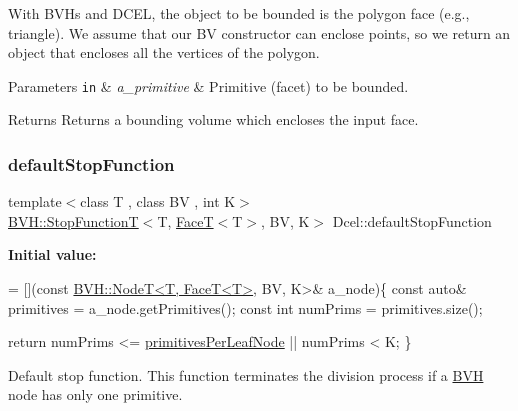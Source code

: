 With B\+V\+Hs and D\+C\+EL, the object to be bounded is the polygon face (e.\+g., triangle). We assume that our BV constructor can enclose points, so we return an object that encloses all the vertices of the polygon. 
\begin{DoxyParams}[1]{Parameters}
\mbox{\tt in}  & {\em a\+\_\+primitive} & Primitive (facet) to be bounded. \\
\hline
\end{DoxyParams}
\begin{DoxyReturn}{Returns}
Returns a bounding volume which encloses the input face. 
\end{DoxyReturn}
\mbox{\label{namespaceDcel_a45e9f2554a8d9ea01164cd51f787f989}} 
\subsubsection{\texorpdfstring{default\+Stop\+Function}{defaultStopFunction}}
{\footnotesize\ttfamily template$<$class T , class BV , int K$>$ \\
\hyperlink{namespaceBVH_afef1c5979c34a11d23b756cc09654bf9}{B\+V\+H\+::\+Stop\+FunctionT}$<$T, \hyperlink{classDcel_1_1FaceT}{FaceT}$<$T$>$, BV, K$>$ Dcel\+::default\+Stop\+Function}

{\bfseries Initial value\+:}
\begin{DoxyCode}
= [](\textcolor{keyword}{const} \hyperlink{classBVH_1_1NodeT}{BVH::NodeT<T, FaceT<T>}, BV, K>& a\_node)\{
    \textcolor{keyword}{const} \textcolor{keyword}{auto}& primitives = a\_node.getPrimitives();
    \textcolor{keyword}{const} \textcolor{keywordtype}{int} numPrims     = primitives.size();
    
    \textcolor{keywordflow}{return} numPrims <= \hyperlink{namespaceDcel_a4db11eb50441e7c4e6c3ae796a202024}{primitivesPerLeafNode} || numPrims < K;
  \}
\end{DoxyCode}


Default stop function. This function terminates the division process if a \hyperlink{namespaceBVH}{B\+VH} node has only one primitive. 

